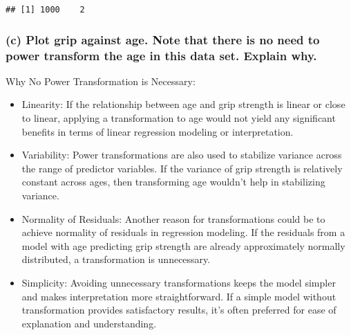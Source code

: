 \documentclass[
]{article}
\newenvironment{Shaded}{\begin{snugshade}}{\end{snugshade}}
\newcommand{\AttributeTok}[1]{\textcolor[rgb]{0.77,0.63,0.00}{#1}}
\newcommand{\CommentTok}[1]{\textcolor[rgb]{0.56,0.35,0.01}{\textit{#1}}}
\newcommand{\DecValTok}[1]{\textcolor[rgb]{0.00,0.00,0.81}{#1}}
\newcommand{\FunctionTok}[1]{\textcolor[rgb]{0.00,0.00,0.00}{#1}}
\newcommand{\NormalTok}[1]{#1}
\newcommand{\SpecialCharTok}[1]{\textcolor[rgb]{0.00,0.00,0.00}{#1}}
\newcommand{\StringTok}[1]{\textcolor[rgb]{0.31,0.60,0.02}{#1}}
\begin{document}
\begin{verbatim}
## [1] 1000    2
\end{verbatim}

\hypertarget{c-plot-grip-against-age.-note-that-there-is-no-need-to-power-transform-the-age-in-this-data-set.-explain-why.}{%
\subsubsection{(c) Plot grip against age. Note that there is no need to
power transform the age in this data set. Explain
why.}\label{c-plot-grip-against-age.-note-that-there-is-no-need-to-power-transform-the-age-in-this-data-set.-explain-why.}}

Why No Power Transformation is Necessary:

\begin{itemize}
\item
  Linearity: If the relationship between age and grip strength is linear
  or close to linear, applying a transformation to age would not yield
  any significant benefits in terms of linear regression modeling or
  interpretation.
\item
  Variability: Power transformations are also used to stabilize variance
  across the range of predictor variables. If the variance of grip
  strength is relatively constant across ages, then transforming age
  wouldn't help in stabilizing variance.
\item
  Normality of Residuals: Another reason for transformations could be to
  achieve normality of residuals in regression modeling. If the
  residuals from a model with age predicting grip strength are already
  approximately normally distributed, a transformation is unnecessary.
\item
  Simplicity: Avoiding unnecessary transformations keeps the model
  simpler and makes interpretation more straightforward. If a simple
  model without transformation provides satisfactory results, it's often
  preferred for ease of explanation and understanding.
\end{itemize}

\begin{Shaded}
\end{Shaded}
\end{document}
